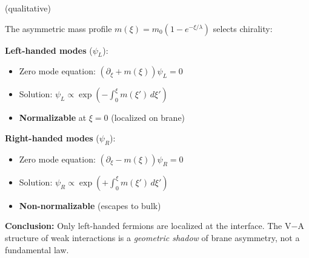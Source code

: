 \begin{proposition}
\label{prop:ch3_va}
\tagDc{} (qualitative)

The asymmetric mass profile $m(\xi) = m_0(1 - e^{-\xi/\lambda})$ selects chirality:

\textbf{Left-handed modes} ($\psi_L$):
\begin{itemize}
  \item Zero mode equation: $(\partial_\xi + m(\xi))\psi_L = 0$
  \item Solution: $\psi_L \propto \exp\left(-\int_0^\xi m(\xi')\,d\xi'\right)$
  \item \textbf{Normalizable} at $\xi = 0$ (localized on brane)
\end{itemize}

\textbf{Right-handed modes} ($\psi_R$):
\begin{itemize}
  \item Zero mode equation: $(\partial_\xi - m(\xi))\psi_R = 0$
  \item Solution: $\psi_R \propto \exp\left(+\int_0^\xi m(\xi')\,d\xi'\right)$
  \item \textbf{Non-normalizable} (escapes to bulk)
\end{itemize}

\textbf{Conclusion:} Only left-handed fermions are localized at the interface.
The V$-$A structure of weak interactions is a \emph{geometric shadow} of brane
asymmetry, not a fundamental law.
\end{proposition}

